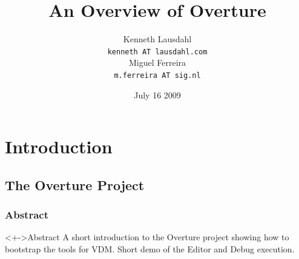 
\usepackage{pgf}
\usepackage{beamerthemesplit}


\newcommand{\pgl}[1]{Peter Gorm Larsen} 
\newcommand{\mail}[1]{{\small \texttt{#1}}}
\newcommand{\yellow}[1]{{\color{yellow} #1}}
\newcommand{\blue}[1]{{\color{blue} #1}}
\newcommand{\red}[1]{{\color{red} #1}}
\newcommand{\green}[1]{{\color{green} #1}}
\newcommand{\fixin}[1]{\fixme[inline]{\texttt{#1}}} 
\newcommand{\fixfo}[1]{\fixme[footnote]{\texttt{#1}}} 
\newcommand{\fixma}[1]{\fixme[margin]{\texttt{#1}}} 
\newcommand{\from}[1]{%
\noindent%
\begin{flushright}%
    \emph{\footnotesize #1}%
\end{flushright}%
} 


\title{An Overview of Overture}

\author[K. Lausdahl, M. Ferreira]{
  Kenneth Lausdahl \\
  \mail{kenneth AT lausdahl.com} \\
  Miguel Ferreira \\
  \mail{m.ferreira AT sig.nl}
}


\date{July 16 2009}



\frame{\titlepage}

\section[Outline]{}
\frame{\tableofcontents}

\section{Introduction}
\subsection{The Overture Project}
\frame
{
  \frametitle{Abstract}

\begin{block}<+->{Abstract}
A short introduction to the Overture project showing how to bootstrap the tools for VDM. Short demo of the Editor and Debug execution.
\end{block}


}


